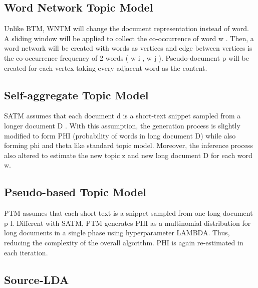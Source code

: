 \documentclass[senior]{IPSstyle}
\begin{document}
\subsection{Word Network Topic Model~\cite{zuo}}

Unlike BTM, WNTM will change the document representation instead of word. A sliding window will be applied to collect the co-occurrence of word w . Then, a word network will be created with words as vertices and edge between vertices is the co-occurrence frequency of 2 words ( w i , w j ). Pseudo-document p will be created for each vertex taking every adjacent word as the content.

\subsection{Self-aggregate Topic Model~\cite{quan}}

SATM assumes that each document d is a short-text snippet sampled from a longer document D . With this assumption, the generation process is slightly modified to form PHI (probability of words in long document D) while also forming phi and theta like standard topic model. Moreover, the inference process also altered to estimate the new topic z and new long document D for each word w.

\subsection{Pseudo-based Topic Model~\cite{zuo2}}

PTM assumes that each short text is a snippet sampled from one long document p l. Different with SATM, PTM generates PHI as a multinomial distribution for long documents in a single phase using hyperparameter LAMBDA. Thus, reducing the complexity of the overall algorithm. PHI is again re-estimated in each iteration.

\subsection{Source-LDA~\cite{wood}}
\end{document}

